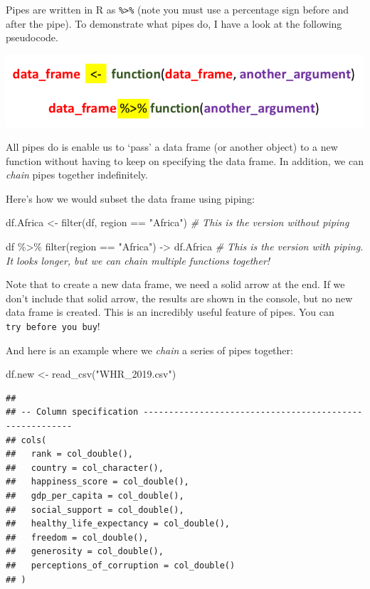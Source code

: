 \documentclass[]{article}
\newenvironment{Shaded}{\begin{snugshade}}{\end{snugshade}}
\newcommand{\CommentTok}[1]{\textcolor[rgb]{0.56,0.35,0.01}{\textit{#1}}}
\newcommand{\FunctionTok}[1]{\textcolor[rgb]{0.00,0.00,0.00}{#1}}
\newcommand{\NormalTok}[1]{#1}
\newcommand{\OtherTok}[1]{\textcolor[rgb]{0.56,0.35,0.01}{#1}}
\newcommand{\SpecialCharTok}[1]{\textcolor[rgb]{0.00,0.00,0.00}{#1}}
\newcommand{\StringTok}[1]{\textcolor[rgb]{0.31,0.60,0.02}{#1}}
\begin{document}
Pipes are written in R as \texttt{\%\textgreater{}\%} (note you must use
a percentage sign before and after the pipe). To demonstrate what pipes
do, I have a look at the following pseudocode.

\includegraphics{piping.png}

All pipes do is enable us to `pass' a data frame (or another object) to
a new function without having to keep on specifying the data frame. In
addition, we can \emph{chain} pipes together indefinitely.

Here's how we would subset the data frame using piping:

\begin{Shaded}
\begin{Highlighting}[]
\NormalTok{df.Africa }\OtherTok{\textless{}{-}} \FunctionTok{filter}\NormalTok{(df, region }\SpecialCharTok{==} \StringTok{"Africa"}\NormalTok{) }\CommentTok{\# This is the version without piping}

\NormalTok{df }\SpecialCharTok{\%\textgreater{}\%} \FunctionTok{filter}\NormalTok{(region }\SpecialCharTok{==} \StringTok{"Africa"}\NormalTok{) }\OtherTok{{-}\textgreater{}}\NormalTok{ df.Africa }\CommentTok{\# This is the version with piping. It looks longer, but we can chain multiple functions together!}
\end{Highlighting}
\end{Shaded}

Note that to create a new data frame, we need a solid arrow at the end.
If we don't include that solid arrow, the results are shown in the
console, but no new data frame is created. This is an incredibly useful
feature of pipes. You can \texttt{try\ before\ you\ buy}!

And here is an example where we \emph{chain} a series of pipes together:

\begin{Shaded}
\begin{Highlighting}[]
\NormalTok{df.new }\OtherTok{\textless{}{-}} \FunctionTok{read\_csv}\NormalTok{(}\StringTok{"WHR\_2019.csv"}\NormalTok{)}
\end{Highlighting}
\end{Shaded}

\begin{verbatim}
## 
## -- Column specification --------------------------------------------------------
## cols(
##   rank = col_double(),
##   country = col_character(),
##   happiness_score = col_double(),
##   gdp_per_capita = col_double(),
##   social_support = col_double(),
##   healthy_life_expectancy = col_double(),
##   freedom = col_double(),
##   generosity = col_double(),
##   perceptions_of_corruption = col_double()
## )
\end{verbatim}
\end{document}
